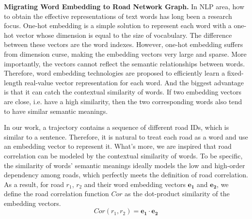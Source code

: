 \vspace{\baselineskip}

\textbf{Migrating Word Embedding to Road Network Graph.} In NLP area, how to obtain the effective representations of text words has long been a research focus. One-hot embedding is a simple solution to represent each word with a one-hot vector whose dimension is equal to the size of vocabulary. The difference between these vectors are the word indexes. However, one-hot embedding suffers from dimension curse, making the embedding vectors very large and sparse. More importantly, the vectors cannot reflect the semantic relationships between words. Therefore, word embedding technologies\cite{word_embed} are proposed to efficiently learn a fixed-length real-value vector representation for each word. And the biggest advantage is that it can catch the contextual similarity of words. If two embedding vectors are close, i.e. have a high similarity, then the two corresponding words also tend to have similar semantic meanings.

In our work, a trajectory contains a sequence of different road IDs, which is similar to a sentence. Therefore, it is natural to treat each road as a word and use an embedding vector to represent it. What's more, we are inspired that road correlation can be modeled by the contextual similarity of words. To be specific, the similarity of words' semantic meanings ideally models the low and high-order dependency among roads, which perfectly meets the definition of road correlation. As a result, for road $r_1$, $r_2$ and their word embedding vectors $\mathbf{e_1}$ and $\mathbf{e_2}$, we define the road correlation function $Cor$ as the dot-product similarity\cite{dot_prod_simi} of the embedding vectors.
\begin{equation}
    Cor(r_1, r_2)=\mathbf{e_1}\cdot \mathbf{e_2}
\end{equation}

\vspace{\baselineskip}

